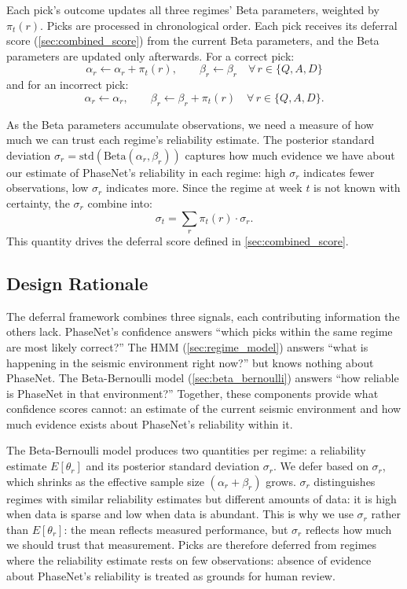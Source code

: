 \medskip
Each pick's outcome updates all three regimes' Beta parameters, weighted by $\pi_t(r)$. Picks are processed in chronological order. Each pick receives its deferral score (\cref{sec:combined_score}) from the current Beta parameters, and the Beta parameters are updated only afterwards. For a correct pick:
\begin{equation}
    \alpha_r \leftarrow \alpha_r + \pi_t(r), \qquad \beta_r \leftarrow \beta_r \quad \forall\, r \in \{Q, A, D\}
\end{equation}
and for an incorrect pick:
\begin{equation}
    \alpha_r \leftarrow \alpha_r, \qquad \beta_r \leftarrow \beta_r + \pi_t(r) \quad \forall\, r \in \{Q, A, D\}.
\end{equation}

As the Beta parameters accumulate observations, we need a measure of how much we can trust each regime's reliability estimate. The posterior standard deviation $\sigma_r = \text{std}(\text{Beta}(\alpha_r, \beta_r))$ captures how much evidence we have about our estimate of PhaseNet's reliability in each regime: high $\sigma_r$ indicates fewer observations, low $\sigma_r$ indicates more. Since the regime at week $t$ is not known with certainty, the $\sigma_r$ combine into:
\begin{equation}
    \sigma_t = \sum_{r} \pi_t(r) \cdot \sigma_r.
    \label{eq:sigma_t}
\end{equation}
This quantity drives the deferral score defined in \cref{sec:combined_score}.

\subsection{Design Rationale}
\label{sec:design_rationale}

The deferral framework combines three signals, each contributing information the others lack. PhaseNet's confidence answers ``which picks within the same regime are most likely correct?'' The HMM (\cref{sec:regime_model}) answers ``what is happening in the seismic environment right now?'' but knows nothing about PhaseNet. The Beta-Bernoulli model (\cref{sec:beta_bernoulli}) answers ``how reliable is PhaseNet in that environment?'' Together, these components provide what confidence scores cannot: an estimate of the current seismic environment and how much evidence exists about PhaseNet's reliability within it.

\medskip
The Beta-Bernoulli model produces two quantities per regime: a reliability estimate $E[\theta_r]$ and its posterior standard deviation $\sigma_r$. We defer based on $\sigma_r$, which shrinks as the effective sample size $(\alpha_r + \beta_r)$ grows. $\sigma_r$ distinguishes regimes with similar reliability estimates but different amounts of data: it is high when data is sparse and low when data is abundant. This is why we use $\sigma_r$ rather than $E[\theta_r]$: the mean reflects measured performance, but $\sigma_r$ reflects how much we should trust that measurement. Picks are therefore deferred from regimes where the reliability estimate rests on few observations: absence of evidence about PhaseNet's reliability is treated as grounds for human review.

